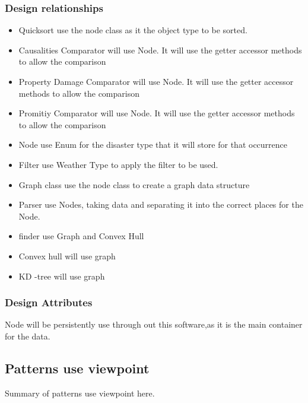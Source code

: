 \documentclass[12pt]{article}
\begin{document}
            \subsubsection{Design relationships}
                \begin{itemize}
                    \item Quicksort use the node class as it the object type to be sorted.
                    \item Causalities Comparator will use Node. It will use the getter accessor methods to allow the comparison 
                    \item Property Damage Comparator will use Node. It will use the getter accessor methods to allow the comparison
                    \item Promitiy Comparator will use Node. It will use the getter accessor methods to allow the comparison 
                    \item Node use Enum for the disaster type that it will store for that occurrence 
                    \item Filter use Weather Type to apply the filter to be used.
                    \item Graph class use the node class to create a graph data structure 
                    \item Parser use Nodes, taking data and separating it into the correct places for the Node.
                    \item finder use Graph and Convex Hull
                    
                    \item Convex hull will use graph 
                    \item KD -tree will use graph 
                \end{itemize}
                
            \subsubsection{Design Attributes}
                Node will be persistently use through out this software,as it is the main container for the data.
                
        \subsection{Patterns use viewpoint}%
            Summary of patterns use viewpoint here.
\end{document}
